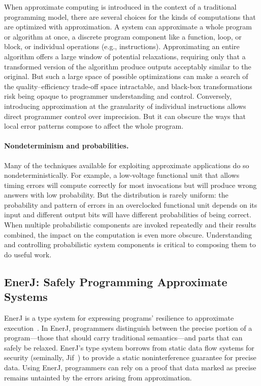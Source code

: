 When approximate computing is introduced in the context of a traditional
programming model, there are several choices for the kinds of computations
that are optimized with approximation. A system can approximate a whole
program or algorithm at once, a discrete program component like a function,
loop, or block, or individual operations (e.g., instructions).
Approximating an entire algorithm 
offers a large window of potential relaxations,
requiring only that a transformed version of the algorithm produce outputs
acceptably similar to the original.
But such a large space of possible optimizations can make a search of the
quality--efficiency trade-off space intractable, and black-box transformations
risk being opaque to programmer understanding and control.
Conversely, introducing approximation at the granularity of individual
instructions allows direct programmer control over imprecision. But it can
obscure the ways that local error patterns compose to affect the whole
program.

\paragraph{Nondeterminism and probabilities.}

Many of the techniques available for exploiting approximate applications do so
nondeterministically. For example, a low-voltage functional unit that allows
timing errors will compute correctly for most invocations but will produce wrong
answers with low probability. But the distribution is rarely uniform: the
probability and pattern of errors in an overclocked functional unit depends on
its input and different output bits will have different probabilities of being
correct. When multiple probabilistic components are invoked repeatedly and
their results combined, the impact on the computation is even more obscure.
Understanding and controlling probabilistic system components is critical to
composing them to do useful work.


\subsection{EnerJ: Safely Programming Approximate Systems}
\label{sec:prelim:enerj}

EnerJ is a type system for expressing programs' resilience to approximate
execution~\cite{enerj}. In EnerJ, programmers distinguish between the precise
portion of a program---those that should carry traditional semantics---and
parts that can safely be relaxed. EnerJ's type system borrows from static data
flow systems for security (seminally, Jif~\cite{jif}) to provide a static
noninterference guarantee for precise data. Using EnerJ, programmers can rely
on a proof that data marked as precise remains untainted by the errors arising
from approximation.

